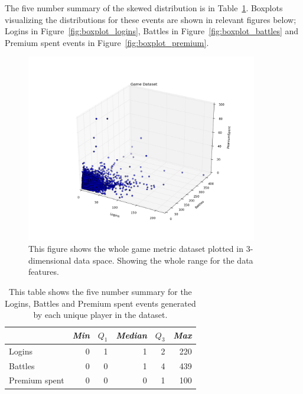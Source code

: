 The five number summary of the skewed distribution is in Table~\ref{tab:FiveSummaryLoginsBattlesPremium}. Boxplots visualizing the distributions for these events are shown in relevant figures below; Logins in Figure~\ref{fig:boxplot_logins}, Battles in Figure~\ref{fig:boxplot_battles} and Premium spent events in Figure~\ref{fig:boxplot_premium}.

\begin{figure}[here]
\centerline{\includegraphics[trim = 10mm 20mm 10mm 30mm, clip, width=0.9\textwidth]{Figures/DatasetZdataWholerealgamedataset.png}}
\caption{This figure shows the whole game metric dataset plotted in $3$-dimensional data space. Showing the whole range for the data features.}
\label{fig:DatasetZdata}
\end{figure}


\begin{table}[h]
\centering
\begin{tabular}{| l | r | r | r | r | r |}
    \hline
    & \textit{Min} & $Q_1$ & \textit{Median} & $Q_3$ & \textit{Max} \\ \hline
    Logins & 0 & 1 & 1 & 2 & 220 \\ \hline
    Battles & 0 & 0 & 1 & 4 & 439 \\ \hline
    Premium spent & 0 & 0 & 0 & 1 & 100 \\ \hline
\end{tabular}
\caption{This table shows the five number summary for the Logins, Battles and Premium spent events generated by each unique player in the dataset.}
\label{tab:FiveSummaryLoginsBattlesPremium}
\end{table}



